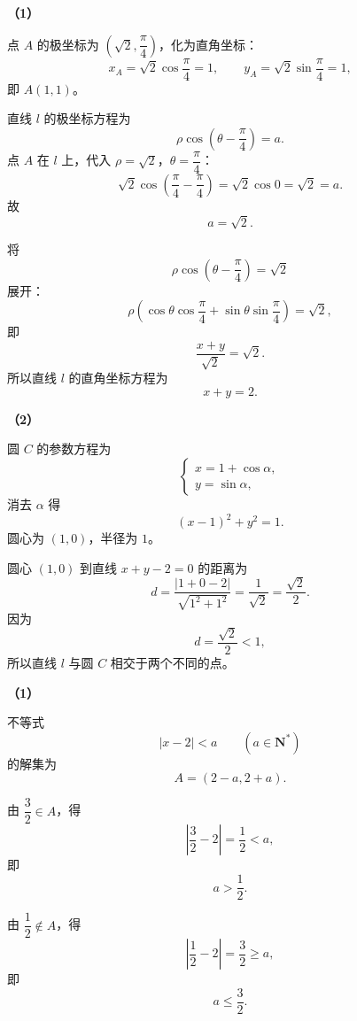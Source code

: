 \begin{answer}

\textbf{（1）}

点 $A$ 的极坐标为 $\left(\sqrt2,\dfrac\pi4\right)$，化为直角坐标：
\nopagebreak[4]
\[x_A=\sqrt2\cos\frac\pi4=1,\qquad y_A=\sqrt2\sin\frac\pi4=1,\]
即 $A(1,1)$。

直线 $l$ 的极坐标方程为
\nopagebreak[4]
\[\rho\cos\left(\theta-\frac\pi4\right)=a.\]
点 $A$ 在 $l$ 上，代入 $\rho=\sqrt2$，$\theta=\dfrac\pi4$：
\nopagebreak[4]
\[\sqrt2\cos\left(\frac\pi4-\frac\pi4\right)=\sqrt2\cos0=\sqrt2=a.\]
故
\nopagebreak[4]
\[a=\sqrt2.\]

将
\nopagebreak[4]
\[\rho\cos\left(\theta-\frac\pi4\right)=\sqrt2\]
展开：
\nopagebreak[4]
\[\rho\left(\cos\theta\cos\frac\pi4+\sin\theta\sin\frac\pi4\right)=\sqrt2,\]
即
\nopagebreak[4]
\[\frac{x+y}{\sqrt2}=\sqrt2.\]
所以直线 $l$ 的直角坐标方程为
\nopagebreak[4]
\[x+y=2.\]

\textbf{（2）}

圆 $C$ 的参数方程为
\nopagebreak[4]
\[\begin{cases}x=1+\cos\alpha,\\y=\sin\alpha,\end{cases}\]
消去 $\alpha$ 得
\nopagebreak[4]
\[(x-1)^2+y^2=1.\]
圆心为 $(1,0)$，半径为 $1$。

圆心 $(1,0)$ 到直线 $x+y-2=0$ 的距离为
\nopagebreak[4]
\[d=\frac{|1+0-2|}{\sqrt{1^2+1^2}}=\frac{1}{\sqrt2}=\frac{\sqrt2}{2}.\]
因为
\nopagebreak[4]
\[d=\frac{\sqrt2}{2}<1,\]
所以直线 $l$ 与圆 $C$ 相交于两个不同的点。


\textbf{（1）}

不等式
\nopagebreak[4]
\[|x-2|<a\qquad(a\in\mathbf N^*)\]
的解集为
\nopagebreak[4]
\[A=(2-a,2+a).\]

由 $\dfrac32\in A$，得
\nopagebreak[4]
\[\left|\frac32-2\right|=\frac12<a,\]
即
\nopagebreak[4]
\[a>\frac12.\]

由 $\dfrac12\notin A$，得
\nopagebreak[4]
\[\left|\frac12-2\right|=\frac32\geqslant a,\]
即
\nopagebreak[4]
\[a\leqslant\frac32.\]


\end{answer}
